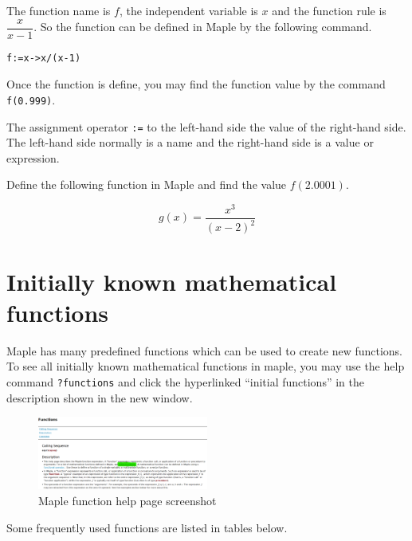 \documentclass[en,11pt,simple]{elegantbook}
\let\BeginKnitrBlock\begin \let\EndKnitrBlock\end
\begin{document}
\BeginKnitrBlock{solution}{}{}
{}The function name is \(f\), the independent variable is \(x\) and the function rule is \(\dfrac{x}{x-1}\). So the function can be defined in Maple by the following command.

\begin{verbatim}
f:=x->x/(x-1)
\end{verbatim}

Once the function is define, you may find the function value by the command \texttt{f(0.999)}.
\EndKnitrBlock{solution}

\BeginKnitrBlock{remark}{}{}
{}
The assignment operator \texttt{:=} to the left-hand side the value of the right-hand side. The left-hand side normally is a name and the right-hand side is a value or expression.
\EndKnitrBlock{remark}

\BeginKnitrBlock{exercise}{}{}
\protect\hypertarget{exr:unnamed-chunk-4}{}{\label{exr:unnamed-chunk-4} }
Define the following function in Maple and find the value \(f(2.0001)\).

\[
g(x)=\dfrac{x^3}{(x-2)^2}
\]
\EndKnitrBlock{exercise}

\hypertarget{initially-known-mathematical-functions}{%
\section{Initially known mathematical functions}\label{initially-known-mathematical-functions}}

Maple has many predefined functions which can be used to create new functions. To see all initially known mathematical functions in maple, you may use the help command \texttt{?functions} and click the hyperlinked ``initial functions'' in the description shown in the new window.

\begin{figure}
\centering
\includegraphics[width=0.5\textwidth,height=\textheight]{figs/Initial-Functions.PNG}
\caption{Maple function help page screenshot}
\end{figure}

Some frequently used functions are listed in tables below.
\end{document}
